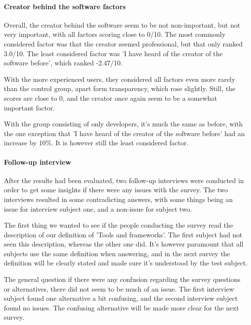 \documentclass{article}
\begin{document}
\paragraph{Creator behind the software factors}

Overall, the creator behind the software seem to be not non-important,
but not very important, with all factors scoring close to 0/10. The most
commonly considered factor was that the creator seemed professional, but
that only ranked 3.0/10. The least considered factor was 'I have heard of
the creator of the software before', which ranked -2.47/10.

With the more experienced users, they considered all factors even more
rarely than the control group, apart form transparency, which rose
slightly. Still, the scores are close to 0, and the creator once again
seem to be a somewhat important factor.

With the group consisting of only developers, it's much the same as
before, with the one exception that 'I have heard of the creator of the
software before' had an increase by 10\%. It is however still the least
considered factor.

\paragraph{Follow-up interview}

After the results had been evaluated, two follow-up interviews were
conducted in order to get some insights if there were any issues with
the survey. The two interviews resulted in some contradicting answers,
with some things being an issue for interview subject one, and a
non-issue for subject two.

The first thing we wanted to see if the people conducting the survey
read the description of our definition of 'Tools and frameworks'. The
first subject had not seen this description, whereas the other one did.
It's however paramount that all subjects use the same definition when
answering, and in the next survey the definition will be clearly stated
and made sure it's understood by the test subject.

The general question if there were any confusion regarding the survey
questions or alternatives, there did not seem to be much of an issue.
The first interview subject found one alternative a bit confusing, and
the second interview subject found no issues. The confusing alternative
will be made more clear for the next survey.
\end{document}
